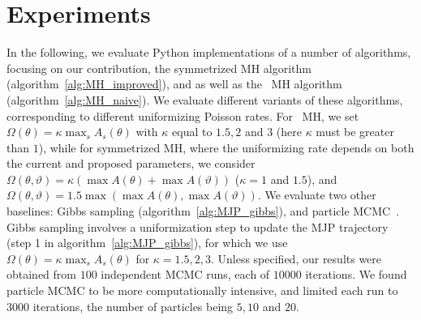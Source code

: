 \vspace{-.2in}
\section{Experiments}\label{sec:expts}
\vspace{-.1in}
In the following, we evaluate Python implementations of a number of algorithms, focusing on our contribution, the symmetrized MH algorithm (algorithm~\ref{alg:MH_improved}), and as well as the \naive\ MH algorithm (algorithm~\ref{alg:MH_naive}).
We evaluate different variants of these algorithms, corresponding to different uniformizing Poisson rates. %
For \naive\ MH, we set $\Omega(\theta) = \kappa \max_s A_s(\theta) $ with $\kappa$  equal to $1.5, 2$ and $3$ (here $\kappa$ must be greater than $1$), 
while for symmetrized MH, where the uniformizing rate depends on both the current and proposed parameters, we consider
 $\Omega(\theta, \vartheta) = \kappa (\max A(\theta) + \max A(\vartheta))$ 
 ($\kappa = 1$ and $1.5$), and 
$\Omega(\theta, \vartheta) = 1.5 \max(\max A(\theta), \max A(\vartheta))$.
We evaluate two other baselines: Gibbs sampling (algorithm~\ref{alg:MJP_gibbs}), %
and particle MCMC~\citep[][see also section~\ref{sec:pmcmc} in the appendix]{Andrieu10}. 
Gibbs sampling involves a uniformization step to update the MJP trajectory (step 1 in algorithm~\ref{alg:MJP_gibbs}), for which we use $\Omega(\theta) = \kappa \max_s A_s(\theta)$ for $\kappa=1.5,2,3$. 
Unless specified, our results were obtained from $100$ independent MCMC runs, each of $10000$ iterations.
We found particle MCMC to be more computationally intensive, and limited each run to $3000$ iterations, the number of particles being $5, 10$ and $20$.%


